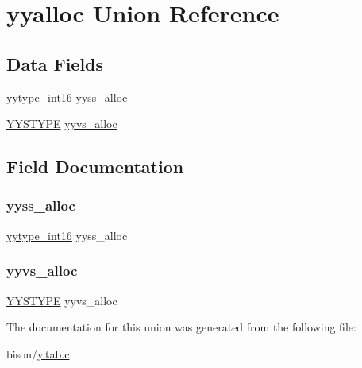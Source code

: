 \hypertarget{unionyyalloc}{}\section{yyalloc Union Reference}
\label{unionyyalloc}
\subsection*{Data Fields}
\begin{DoxyCompactItemize}
\item 
\hyperlink{y_8tab_8c_ade5b97f0021a4f6c5922ead3744ab297}{yytype\+\_\+int16} \hyperlink{unionyyalloc_a26e6b311cc4eccee5ad7ac3840622b22}{yyss\+\_\+alloc}
\item 
\hyperlink{union_y_y_s_t_y_p_e}{Y\+Y\+S\+T\+Y\+PE} \hyperlink{unionyyalloc_a891efbd91c083d987c99bd4be8d06f50}{yyvs\+\_\+alloc}
\end{DoxyCompactItemize}


\subsection{Field Documentation}
\mbox{\label{unionyyalloc_a26e6b311cc4eccee5ad7ac3840622b22}} 
\subsubsection{\texorpdfstring{yyss\+\_\+alloc}{yyss\_alloc}}
{\footnotesize\ttfamily \hyperlink{y_8tab_8c_ade5b97f0021a4f6c5922ead3744ab297}{yytype\+\_\+int16} yyss\+\_\+alloc}

\mbox{\label{unionyyalloc_a891efbd91c083d987c99bd4be8d06f50}} 
\subsubsection{\texorpdfstring{yyvs\+\_\+alloc}{yyvs\_alloc}}
{\footnotesize\ttfamily \hyperlink{union_y_y_s_t_y_p_e}{Y\+Y\+S\+T\+Y\+PE} yyvs\+\_\+alloc}



The documentation for this union was generated from the following file\+:\begin{DoxyCompactItemize}
\item 
bison/\hyperlink{y_8tab_8c}{y.\+tab.\+c}\end{DoxyCompactItemize}
